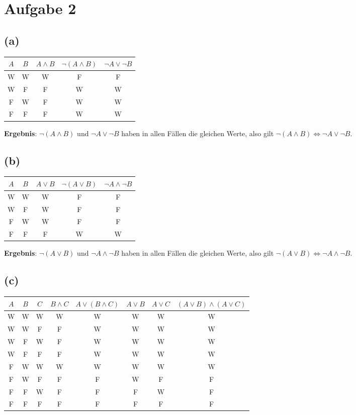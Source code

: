 \documentclass[a4paper]{scrartcl}
\begin{document}
\section*{Aufgabe 2}
\subsection*{(a)}

\begin{tabular}{|c|c|c|c|c|}
\hline
$A$ & $B$ & $A \land B$ & $\neg (A \land B)$ & $\neg A \lor \neg B$ \\
\hline
W & W & W & F & F \\
W & F & F & W & W \\
F & W & F & W & W \\
F & F & F & W & W \\
\hline
\end{tabular}

\textbf{Ergebnis}: $\neg (A \land B)$ und $\neg A \lor \neg B$ haben in allen Fällen die gleichen Werte, also gilt $\neg (A \land B) \Leftrightarrow \neg A \lor \neg B$.

\subsection*{(b)}

\begin{tabular}{|c|c|c|c|c|}
\hline
$A$ & $B$ & $A \lor B$ & $\neg (A \lor B)$ & $\neg A \land \neg B$ \\
\hline
W & W & W & F & F \\
W & F & W & F & F \\
F & W & W & F & F \\
F & F & F & W & W \\
\hline
\end{tabular}

\textbf{Ergebnis}: $\neg (A \lor B)$ und $\neg A \land \neg B$ haben in allen Fällen die gleichen Werte, also gilt $\neg (A \lor B) \Leftrightarrow \neg A \land \neg B$.

\subsection*{(c)}

\begin{tabular}{|c|c|c|c|c|c|c|c|}
\hline
$A$ & $B$ & $C$ & $B \land C$ & $A \lor (B \land C)$ & $A \lor B$ & $A \lor C$ & $(A \lor B) \land (A \lor C)$ \\
\hline
W & W & W & W & W & W & W & W \\
W & W & F & F & W & W & W & W \\
W & F & W & F & W & W & W & W \\
W & F & F & F & W & W & W & W \\
F & W & W & W & W & W & W & W \\
F & W & F & F & F & W & F & F \\
F & F & W & F & F & F & W & F \\
F & F & F & F & F & F & F & F \\
\hline
\end{tabular}
\end{document}

